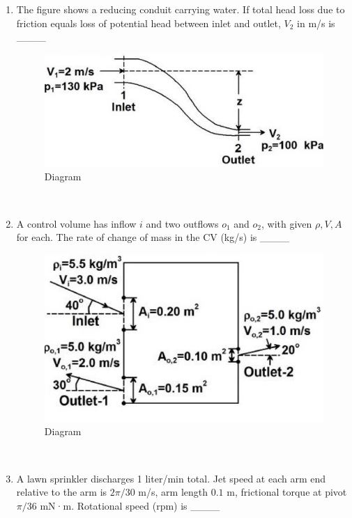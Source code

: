 \documentclass[journal,12pt,onecolumn]{IEEEtran}
\begin{document}
\begin{enumerate}
\begin{enumerate}
\begin{enumerate}[label=\arabic*)]
\begin{multicols}{4}
\begin{enumerate}
\item The figure shows a reducing conduit carrying water. If total head loss due to friction equals loss of potential head between inlet and outlet, $V_2$ in m/s is \_\_\_\_

\begin{figure}[htbp]
  \centering
  \includegraphics[width=.68\linewidth]{figs/B/fig4.png} 
  \caption{Diagram}
  \label{B/fig4}
\end{figure}
\hfill{} \\

\newpage

\item A control volume has inflow $i$ and two outflows $o_1$ and $o_2$, with given $\rho, V, A$ for each. The rate of change of mass in the CV (kg/s) is \_\_\_\_
\vspace{0.2cm}

\begin{figure}[htbp]
  \centering
  \includegraphics[width=.68\linewidth]{figs/B/fig5.png} 
  \caption{Diagram}
  \label{B/fig5}
\end{figure}
\hfill{} \\

\vspace{0.5cm}

\item A lawn sprinkler discharges 1 liter/min total. Jet speed at each arm end relative to the arm is $2\pi/30$ m/s, arm length $0.1$ m, frictional torque at pivot $\pi/36$ mN·m. Rotational speed (rpm) is \_\_\_\_


\end{enumerate}
\end{multicols}
\end{enumerate}
\end{enumerate}
\end{enumerate}
\end{document}
